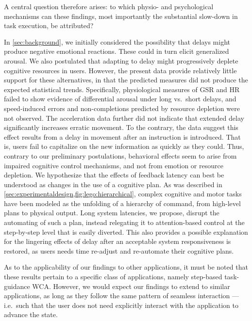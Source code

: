 A central question therefore arises: to which physio- and psychological mechanisms can these findings, most importantly the substantial slow-down in task execution, be attributed?

In \cref{sec:background}, we initially considered the possibility that delays might produce negative emotional reactions.
These could in turn elicit generalized arousal.
We also postulated that adapting to delay might progressively deplete cognitive resources in users.
However, the present data provide relatively little support for these alternatives, in that the predicted measures did not produce the expected statistical trends.
Specifically, physiological measures of GSR and HR failed to show evidence of differential arousal under long vs.\ short delays, and speed-induced errors and non-completions predicted by resource depletion were not observed.
The acceleration data further did not indicate that extended delay significantly increases erratic movement.
To the contrary, the data suggest this effect results from a delay in movement after an instruction is introduced.
That is, users fail to capitalize on the new information as quickly as they could.
Thus, contrary to our preliminary postulations, behavioral effects seem to arise from impaired cognitive control mechanisms, and not from emotion or resource depletion.
We hypothesize that the effects of feedback latency can best be understood as changes in the use of a cognitive plan.
As was described in \cref{sec:experimentaldesign,fig:lego:hierarchical}, complex cognitive and motor tasks have been modeled as the unfolding of a hierarchy of command, from high-level plans to physical output.
Long system latencies, we propose, disrupt the automating of such a plan, instead relegating it to attention-based control at the step-by-step level that is easily diverted.
This also provides a possible explanation for the lingering effects of delay after an acceptable system responsiveness is restored, as users needs time re-adjust and re-automate their cognitive plans.

As to the applicability of our findings to other applications, it must be noted that these results pertain to a specific class of applications, namely step-based task-guidance WCA.\@
However, we would expect our findings to extend to similar applications, as long as they follow the same pattern of seamless interaction --- i.e.\ such that the user does not need explicitly interact with the application to advance the state.

